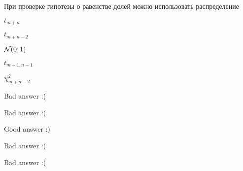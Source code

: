 
\begin{question}
При проверке гипотезы о равенстве долей можно использовать распределение
\begin{answerlist}
  \item \(t_{m+n}\)
  \item \(t_{m+n-2}\)
  \item \(\mathcal{N}(0;1)\)
  \item \(t_{m-1,n-1}\)
  \item \(\chi^2_{m+n-2}\)
\end{answerlist}
\end{question}

\begin{solution}
\begin{answerlist}
  \item Bad answer :(
  \item Bad answer :(
  \item Good answer :)
  \item Bad answer :(
  \item Bad answer :(
\end{answerlist}
\end{solution}

